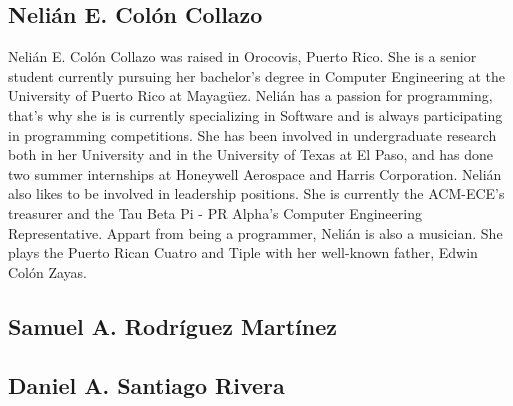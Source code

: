 
\subsection{Nelián E. Colón Collazo}
Nelián E. Colón Collazo was raised in Orocovis, Puerto Rico. She is a senior student currently pursuing her bachelor's degree in Computer Engineering at the University of Puerto Rico at Mayagüez.  Nelián has a passion for programming, that's why she is  is currently specializing in Software and is always participating in programming competitions. She has been involved in undergraduate research both in her University and in the University of Texas at El Paso, and has done two summer internships at Honeywell Aerospace and Harris Corporation. Nelián also likes to be involved in leadership positions. She is currently the ACM-ECE's treasurer and the Tau Beta Pi - PR Alpha's Computer Engineering Representative. Appart from being a programmer, Nelián is also a musician. She plays the Puerto Rican Cuatro and Tiple with her well-known father, Edwin Colón Zayas. 

\subsection{Samuel A. Rodríguez Martínez}

\subsection{Daniel A. Santiago Rivera}

